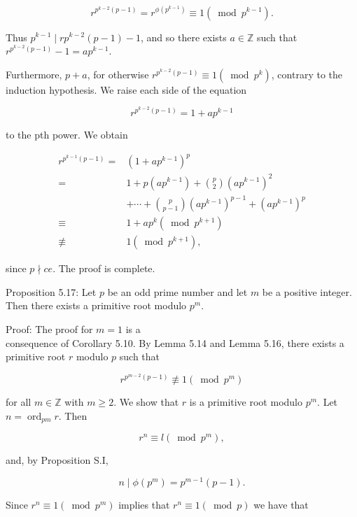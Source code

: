 \documentclass[10pt]{article}
\begin{document}
$$
r^{p^{k-2}(p-1)}=r^{\phi\left(p^{k-1}\right)} \equiv 1\left(\bmod p^{k-1}\right) .
$$

Thus $p^{k-1} \mid r p^{k-2}(p-1)-1$, and so there exists $a \in \mathbb{Z}$ such that $r^{p^{k-2}(p-1)}-1=a p^{k-1}$.

Furthermore, $p+a$, for otherwise $r^{p^{k-2}(p-1)} \equiv 1\left(\bmod p^{k}\right)$, contrary to the induction hypothesis. We raise each side of the equation

$$
r^{p^{k-2}(p-1)}=1+a p^{k-1}
$$

to the pth power. We obtain

$$
\begin{aligned}
r^{p^{k-1}(p-1)}= & \left(1+a p^{k-1}\right)^{p} \\
= & 1+p\left(a p^{k-1}\right)+\binom{p}{2}\left(a p^{k-1}\right)^{2} \\
& +\cdots+\binom{p}{p-1}\left(a p^{k-1}\right)^{p-1}+\left(a p^{k-1}\right)^{p} \\
\equiv & 1+a p^{k}\left(\bmod p^{k+1}\right) \\
\not \equiv & 1\left(\bmod p^{k+1}\right),
\end{aligned}
$$

since $p \nmid c e$. The proof is complete.

Proposition 5.17: Let $p$ be an odd prime number and let $m$ be a positive integer. Then there exists a primitive root modulo $p^{m}$.

Proof: The proof for $m=1$ is a\\
consequence of Corollary 5.10. By Lemma 5.14 and Lemma 5.16, there exists a primitive root $r$ modulo $p$ such that


\begin{equation*}
r^{p^{m-2}(p-1)} \not \equiv 1\left(\bmod p^{m}\right) \tag{3}
\end{equation*}


for all $m \in \mathbb{Z}$ with $m \geqslant 2$. We show that $r$ is a primitive root modulo $p^{m}$. Let $n=\operatorname{ord}_{p m} r$. Then

$$
r^{n} \equiv l\left(\bmod p^{m}\right),
$$

and, by Proposition S.I,


\begin{equation*}
n \mid \phi\left(p^{m}\right)=p^{m-1}(p-1) . \tag{4}
\end{equation*}


Since $r^{n} \equiv 1\left(\bmod p^{m}\right)$ implies that $r^{n} \equiv 1(\bmod p)$ we have that
\end{document}
